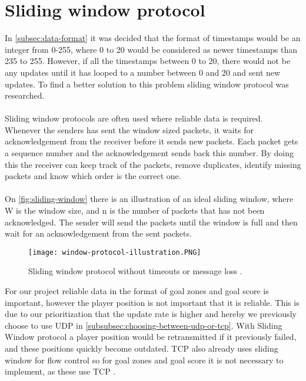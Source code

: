 \section{Sliding window protocol}
In \autoref{subsec:data-format} it was decided that the format of timestamps would be an integer from 0-255, where 0 to 20 would be considered as newer timestamps than 235 to 255.
However, if all the timestamps between 0 to 20, there would not be any updates until it has looped to a number between 0 and 20 and sent new updates.
To find a better solution to this problem sliding window protocol was researched.
\\\\
Sliding window protocols are often used where reliable data is required.
Whenever the senders has sent the window sized packets, it waits for acknowledgement from the receiver before it sends new packets.
Each packet gets a sequence number and the acknowledgement sends back this number.
By doing this the receiver can keep track of the packets, remove duplicates, identify missing packets and know which order is the correct one.
\\\\
On \autoref{fig:sliding-window} there is an illustration of an ideal sliding window, where W is the window size, and n is the number of packets that has not been acknowledged.
The sender will send the packets until the window is full and then wait for an acknowledgement from the sent packets.
\begin{figure}[H]
    \centering
    \texttt{[image: window-protocol-illustration.PNG]}
    \caption{Sliding window protocol without timeouts or message loss \cite{design-and-validation-of-computer-protocols}.}
    \label{fig:sliding-window}
\end{figure}
\noindent
For our project reliable data in the format of goal zones and goal score is important, however the player position is not important that it is reliable.
This is due to our prioritization that the update rate is higher and hereby we previously choose to use UDP in \autoref{subsubsec:choosing-between-udp-or-tcp}.
With Sliding Window protocol a player position would be retransmitted if it previously failed, and these positions quickly become outdated.
TCP also already uses sliding window for flow control so for goal zones and goal score it is not necessary to implement, as these use TCP \cite{ibm:sliding-window}.
